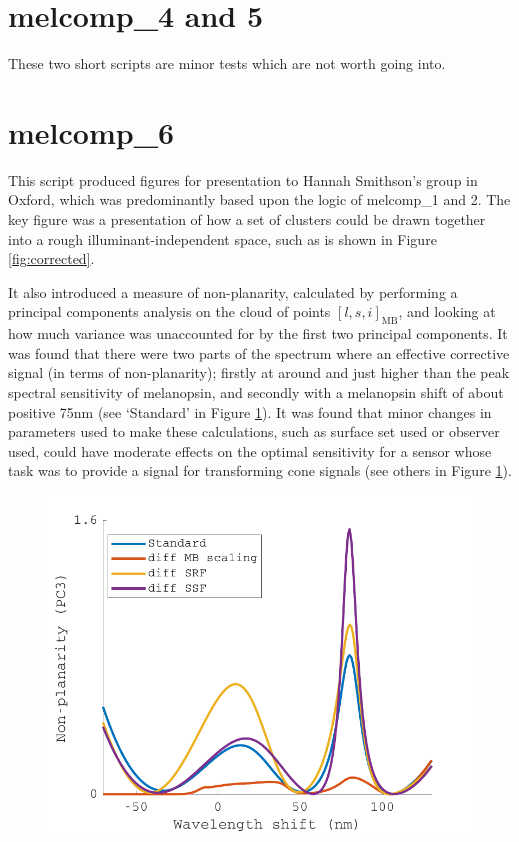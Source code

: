 



\section{melcomp\_4 and 5}
These two short scripts are minor tests which are not worth going into.

\section{melcomp\_6}
This script produced figures for presentation to Hannah Smithson's group in Oxford, which was predominantly based upon the logic of melcomp\_1 and 2. The key figure was a presentation of how a set of clusters could be drawn together into a rough illuminant-independent space, such as is shown in Figure \ref{fig:corrected}.

It also introduced a measure of non-planarity, calculated by performing a principal components analysis on the cloud of points $[l,s,i]_{\text{MB}}$, and looking at how much variance was unaccounted for by the first two principal components. It was found that there were two parts of the spectrum where an effective corrective signal (in terms of non-planarity); firstly at around and just higher than the peak spectral sensitivity of melanopsin, and secondly with a melanopsin shift of about positive 75nm (see `Standard' in Figure \ref{fig:PC3}). It was found that minor changes in parameters used to make these calculations, such as surface set used or observer used, could have moderate effects on the optimal sensitivity for a sensor whose task was to provide a signal for transforming cone signals (see others in Figure \ref{fig:PC3}).

\begin{figure}[htbp]
    \includegraphics[max width=\textwidth]{figs/comp/melcomp_6/PC3.pdf}
    \caption{}
    \label{fig:PC3}
\end{figure} 

